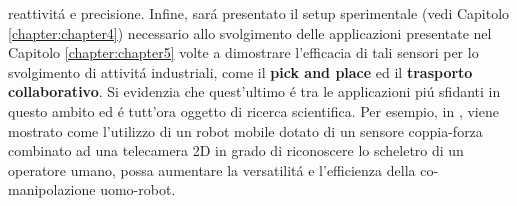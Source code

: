 reattivit\'{a} e precisione. Infine, sar\'{a} presentato il setup sperimentale (vedi Capitolo \ref{chapter:chapter4}) necessario 
allo svolgimento delle applicazioni presentate nel Capitolo \ref{chapter:chapter5} volte a dimostrare l'efficacia
di tali sensori per lo svolgimento di attivit\'{a} industriali, come il \textbf{pick and place} ed il \textbf{trasporto collaborativo}. 
Si evidenzia che quest'ultimo \'{e} tra le applicazioni pi\'{u} sfidanti in questo ambito ed \'{e} tutt'ora oggetto di ricerca scientifica. 
Per esempio, in \cite{de2021towards}, viene mostrato come l'utilizzo di un robot mobile dotato 
di un sensore coppia-forza combinato ad una telecamera 2D in grado di riconoscere lo scheletro di un operatore umano, possa 
aumentare la versatilit\'{a} e l'efficienza della co-manipolazione uomo-robot.
